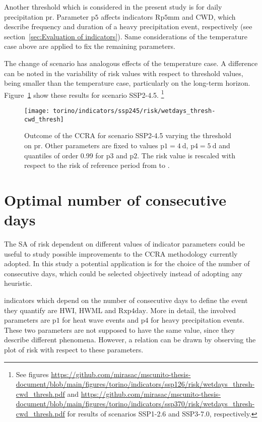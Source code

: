 Another threshold which is considered in the present study is for daily precipitation \gls{pr}. Parameter $\mathrm{p5}$ affects \glspl{indicator} $\mathrm{Rp5mm}$ and $\mathrm{CWD}$, which describe frequency and duration of a heavy precipitation event, respectively (see section~\ref{sec:Evaluation of indicators}). Same considerations of the temperature case above are applied to fix the remaining parameters.

The change of scenario has analogous effects of the temperature case. A difference can be noted in the variability of risk values with respect to threshold values, being smaller than the temperature case, particularly on the long-term horizon. Figure~\ref{fig:ssp245_risk_wetdays_thresh-cwd_thresh} show these results for scenario SSP2-4.5.%
\footnote{See figures \url{https://github.com/mirasac/mscunito-thesis-document/blob/main/figures/torino/indicators/ssp126/risk/wetdays_thresh-cwd_thresh.pdf} and \url{https://github.com/mirasac/mscunito-thesis-document/blob/main/figures/torino/indicators/ssp370/risk/wetdays_thresh-cwd_thresh.pdf} for results of scenarios SSP1-2.6 and SSP3-7.0, respectively.}

\begin{figure}[h]
  \centering
  \texttt{[image: torino/indicators/ssp245/risk/wetdays\_thresh-cwd\_thresh]}
  \caption{Outcome of the \gls{CCRA} for scenario SSP2-4.5 varying the threshold on \gls{pr}. Other parameters are fixed to values $\mathrm{p1} = \qty{4}{\day}$, $\mathrm{p4} = \qty{5}{\day}$ and quantiles of order 0.99 for $\mathrm{p3}$ and $\mathrm{p2}$. The risk value is rescaled with respect to the risk of reference period from  to .}
  \label{fig:ssp245_risk_wetdays_thresh-cwd_thresh}
\end{figure}



\section{Optimal number of consecutive days}
The \gls{SA} of risk dependent on different values of indicator parameters could be useful to study possible improvements to the \gls{CCRA} methodology currently adopted. In this study a potential application is for the choice of the number of consecutive days, which could be selected objectively instead of adopting any heuristic.

\Glspl{indicator} which depend on the number of consecutive days to define the event they quantify are $\mathrm{HWI}$, $\mathrm{HWML}$ and $\mathrm{Rxp4day}$. More in detail, the involved parameters are $\mathrm{p1}$ for heat wave events and $\mathrm{p4}$ for heavy precipitation events. These two parameters are not supposed to have the same value, since they describe different phenomena. However, a relation can be drawn by observing the plot of risk with respect to these parameters.

